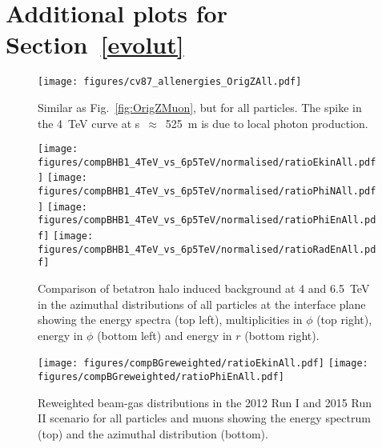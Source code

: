 \section{Additional plots for Section~\ref{evolut} \label{evolutApp}}
\begin{figure}[!htb]
\begin{center}
  \texttt{[image: figures/cv87\_allenergies\_OrigZAll.pdf]}
\end{center}
\vspace{-0.6cm}
 \caption{Similar as Fig.~\ref{fig:OrigZMuon}, but for all particles. The spike in the 4~TeV curve at s~$\approx$~525~m is due to local photon production.
  \label{fig:OrigZAll}} 
\end{figure}





\begin{figure}
\centering
  \texttt{[image: figures/compBHB1\_4TeV\_vs\_6p5TeV/normalised/ratioEkinAll.pdf]}
  \texttt{[image: figures/compBHB1\_4TeV\_vs\_6p5TeV/normalised/ratioPhiNAll.pdf]}
  \texttt{[image: figures/compBHB1\_4TeV\_vs\_6p5TeV/normalised/ratioPhiEnAll.pdf]}
  \texttt{[image: figures/compBHB1\_4TeV\_vs\_6p5TeV/normalised/ratioRadEnAll.pdf]}
\vspace{-0.6cm}
 \caption{Comparison of betatron halo induced background at 4 and 6.5~TeV in the azimuthal distributions of all particles at the interface plane showing the energy spectra (top left), multiplicities in $\phi$ (top right), energy in $\phi$ (bottom left) and energy in $r$ (bottom right).
  \label{compBHB1run1run22}}
\end{figure}









\begin{figure}%
\centering
\texttt{[image: figures/compBGreweighted/ratioEkinAll.pdf]}
\texttt{[image: figures/compBGreweighted/ratioPhiEnAll.pdf]}
\caption{Reweighted beam-gas distributions in the 2012 Run I and 2015 Run II scenario for all particles and muons showing the energy spectrum (top) and the azimuthal distribution (bottom).
  \label{fig:compBGreweighted12}}
\end{figure}




